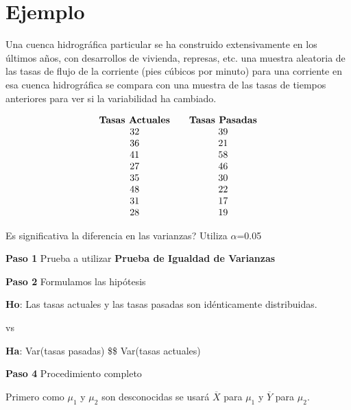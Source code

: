 \documentclass[a4paper,oneside,openany]{book}
\begin{document}
\section{Ejemplo}\label{ejemplo-7}

Una cuenca hidrográfica particular se ha construido extensivamente en
los últimos años, con desarrollos de vivienda, represas, etc. una
muestra aleatoria de las tasas de flujo de la corriente (pies cúbicos
por minuto) para una corriente en esa cuenca hidrográfica se compara con
una muestra de las tasas de tiempos anteriores para ver si la
variabilidad ha cambiado.

\[
\begin{equation*}
\begin{array}{c c c} 
\textbf{Tasas Actuales} &  & \textbf{Tasas Pasadas} \\
32 & & 39 \\
36 & & 21 \\
41 & & 58 \\
27 & & 46 \\
35 & & 30 \\
48 & & 22 \\
31 & & 17 \\
28 & & 19 \\
\end{array}
\end{equation*}
\]

Es significativa la diferencia en las varianzas? Utiliza \(\alpha\)=0.05

\textbf{Paso 1} Prueba a utilizar \textbf{Prueba de Igualdad de
Varianzas}

\textbf{Paso 2} Formulamos las hipótesis

\textbf{Ho}: Las tasas actuales y las tasas pasadas son idénticamente
distribuidas.

vs

\textbf{Ha}: Var(tasas pasadas) \$\neq \$ Var(tasas actuales)

\textbf{Paso 4} Procedimiento completo

Primero como \(\mu_{1}\) y \(\mu_{2}\) son desconocidas se usará
\(\overline{X}\) para \(\mu_{1}\) y \(\overline{Y}\) para \(\mu_{2}\).
\end{document}
